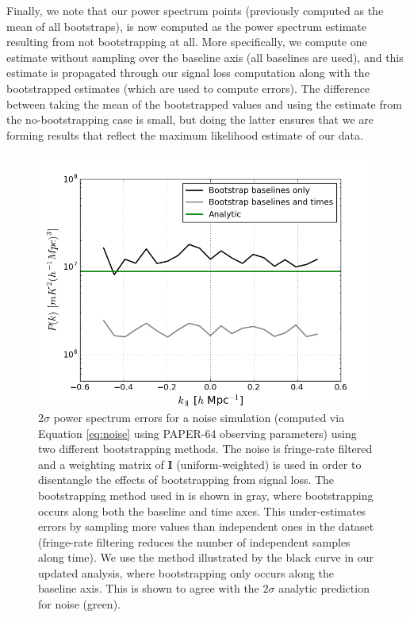 \documentclass[preprint2,numberedappendix,tighten]{aastex6}  %
\begin{document}
Finally, we note that our power spectrum points (previously computed as the mean of all bootstraps), is now computed as the power spectrum estimate resulting from not bootstrapping at all. More specifically, we compute one estimate without sampling over the baseline axis (all baselines are used), and this estimate is propagated through our signal loss computation along with the bootstrapped estimates (which are used to compute errors). The difference between taking the mean of the bootstrapped values and using the estimate from the no-bootstrapping case is small, but doing the latter ensures that we are forming results that reflect the maximum likelihood estimate of our data.

\begin{figure}
	\centering
	\includegraphics[trim={0.3cm 0cm 0.3cm 0.3cm},width=\columnwidth]{plots/noise_errors.png}
	\caption{$2\sigma$ power spectrum errors for a noise simulation (computed via Equation \eqref{eq:noise} using PAPER-64 observing parameters) using two different bootstrapping 
methods. The noise is fringe-rate filtered and a weighting matrix of $\textbf{I}$ (uniform-weighted) is used in order to disentangle the 
effects of bootstrapping from signal loss. The bootstrapping method used in  is shown in gray, where bootstrapping occurs along both the baseline and time axes. This under-estimates errors by sampling more values than independent ones in the dataset (fringe-rate filtering reduces the number of independent samples along time). We use the method illustrated by the black curve in our updated analysis, where bootstrapping only occurs along the baseline axis. This is shown to agree with the $2\sigma$ analytic prediction for noise (green).}
	\label{fig:data_errors}
\end{figure}
\end{document}
